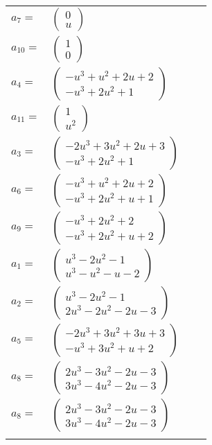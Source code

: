 \documentclass[1p]{elsarticle_modified}
\theoremstyle{definition}
\begin{document}
\begin{tabular}{m{7pt} m{180pt} m{7pt} m{180pt} }
\flushright $a_{7}=$&$\begin{pmatrix}0\\u\end{pmatrix}$ \\
\flushright $a_{10}=$&$\begin{pmatrix}1\\0\end{pmatrix}$ \\
\flushright $a_{4}=$&$\begin{pmatrix}- u^3+u^2+2 u+2\\- u^3+2 u^2+1\end{pmatrix}$ \\
\flushright $a_{11}=$&$\begin{pmatrix}1\\u^2\end{pmatrix}$ \\
\flushright $a_{3}=$&$\begin{pmatrix}-2 u^3+3 u^2+2 u+3\\- u^3+2 u^2+1\end{pmatrix}$ \\
\flushright $a_{6}=$&$\begin{pmatrix}- u^3+u^2+2 u+2\\- u^3+2 u^2+u+1\end{pmatrix}$ \\
\flushright $a_{9}=$&$\begin{pmatrix}- u^3+2 u^2+2\\- u^3+2 u^2+u+2\end{pmatrix}$ \\
\flushright $a_{1}=$&$\begin{pmatrix}u^3-2 u^2-1\\u^3- u^2- u-2\end{pmatrix}$ \\
\flushright $a_{2}=$&$\begin{pmatrix}u^3-2 u^2-1\\2 u^3-2 u^2-2 u-3\end{pmatrix}$ \\
\flushright $a_{5}=$&$\begin{pmatrix}-2 u^3+3 u^2+3 u+3\\- u^3+3 u^2+u+2\end{pmatrix}$ \\
\flushright $a_{8}=$&$\begin{pmatrix}2 u^3-3 u^2-2 u-3\\3 u^3-4 u^2-2 u-3\end{pmatrix}$\\ \flushright $a_{8}=$&$\begin{pmatrix}2 u^3-3 u^2-2 u-3\\3 u^3-4 u^2-2 u-3\end{pmatrix}$\\&\end{tabular}
\end{document}
